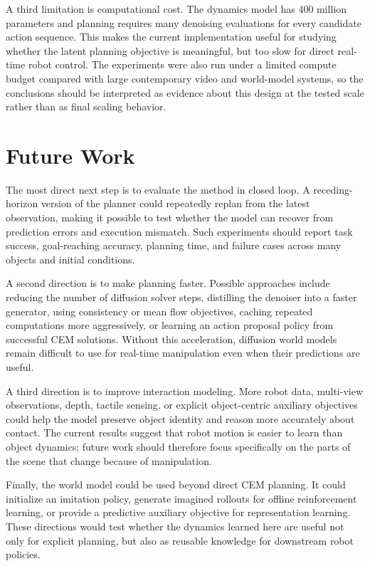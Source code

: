 \documentclass[12pt]{report}
\begin{document}
A third limitation is computational cost. The dynamics model has 400 million parameters and planning requires many denoising evaluations for every candidate action sequence. This makes the current implementation useful for studying whether the latent planning objective is meaningful, but too slow for direct real-time robot control. The experiments were also run under a limited compute budget compared with large contemporary video and world-model systems, so the conclusions should be interpreted as evidence about this design at the tested scale rather than as final scaling behavior.

\section{Future Work}
The most direct next step is to evaluate the method in closed loop. A receding-horizon version of the planner could repeatedly replan from the latest observation, making it possible to test whether the model can recover from prediction errors and execution mismatch. Such experiments should report task success, goal-reaching accuracy, planning time, and failure cases across many objects and initial conditions.

A second direction is to make planning faster. Possible approaches include reducing the number of diffusion solver steps, distilling the denoiser into a faster generator, using consistency or mean flow objectives, caching repeated computations more aggressively, or learning an action proposal policy from successful CEM solutions. Without this acceleration, diffusion world models remain difficult to use for real-time manipulation even when their predictions are useful.

A third direction is to improve interaction modeling. More robot data, multi-view observations, depth, tactile sensing, or explicit object-centric auxiliary objectives could help the model preserve object identity and reason more accurately about contact. The current results suggest that robot motion is easier to learn than object dynamics; future work should therefore focus specifically on the parts of the scene that change because of manipulation.

Finally, the world model could be used beyond direct CEM planning. It could initialize an imitation policy, generate imagined rollouts for offline reinforcement learning, or provide a predictive auxiliary objective for representation learning. These directions would test whether the dynamics learned here are useful not only for explicit planning, but also as reusable knowledge for downstream robot policies.
\end{document}
